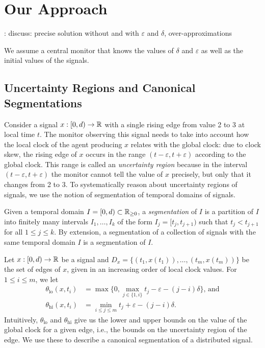 \section{Our Approach}

\TODO: discuss: precise solution without and with $\varepsilon$ and $\delta$, over-approximations


We assume a central monitor that knows the values of $\delta$ and $\varepsilon$ as well as the initial values of the signals.

\subsection{Uncertainty Regions and Canonical Segmentations} \label{sec:segment}

Consider a signal $x : [0,d) \to \mathbb{R}$ with a single rising edge from value 2 to 3 at local time $t$.
The monitor observing this signal needs to take into account how the local clock of the agent producing $x$ relates with the global clock: due to clock skew, the rising edge of $x$ occurs in the range $(t - \varepsilon, t + \varepsilon)$ according to the global clock.
This range is called an \emph{uncertainty region} because in the interval $(t - \varepsilon, t + \varepsilon)$ the monitor cannot tell the value of $x$ precisely, but only that it changes from 2 to 3.
To systematically reason about uncertainty regions of signals, we use the notion of segmentation of temporal domains of signals.

Given a temporal domain $I = [0,d) \subset \mathbb{R}_{\geq 0}$, a \emph{segmentation} of $I$ is a partition of $I$ into finitely many intervals $I_1, \ldots, I_k$ of the form $I_j = [t_j, t_{j+1})$ such that $t_j < t_{j+1}$ for all $1 \leq j \leq k$.
By extension, a segmentation of a collection of signals with the same temporal domain $I$ is a segmentation of $I$.

Let $x : [0,d) \to \mathbb{R}$ be a signal and $D_x = \{(t_1, x(t_1)), \ldots, (t_m, x(t_m))\}$ be the set of edges of $x$, given in an increasing order of local clock values.
For $1 \leq i \leq m$, we let 
\begin{align*}
	\theta_{\text{lo}}(x,t_i) &= \max\{0, \max_{j \in \{1, i\}} t_j - \varepsilon - (j-i)\delta\} \text{, and} \\
	\theta_{\text{hi}}(x,t_i) &= \min_{i \leq j \leq m} t_j + \varepsilon - (j-i)\delta.
\end{align*}
Intuitively, $\theta_{\text{lo}}$ and $\theta_{\text{hi}}$ give us the lower and upper bounds on the value of the global clock for a given edge, i.e., the bounds on the uncertainty region of the edge.
We use these to describe a canonical segmentation of a distributed signal.

